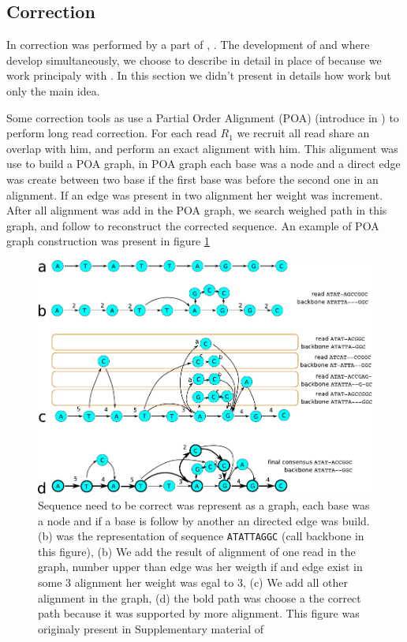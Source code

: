 \documentclass[main]{subfiles}
\begin{document}
\subsection{Correction}

In \canu correction was performed by a part of  \cite{falcon}, . The development of  and \canu where develop simultaneously, we choose to describe \canu in detail in place of  because we work principaly with \canu. In this section we didn't present in details how  work but only the main idea.

Some correction tools as  use a Partial Order Alignment (POA) (introduce in \cite{poa}) to perform long read correction. For each read \texttt{$R_1$} we recruit all read share an overlap with him, and perform an exact alignment with him. This alignment was use to build a POA graph, in POA graph each base was a node and a direct edge was create between two base if the first base was before the second one in an alignment. If an edge was present in two alignment her weight was increment. After all alignment was add in the POA graph, we search weighed path in this graph, and follow to reconstruct the corrected sequence. An example of POA graph construction was present in figure \ref{sota:fig:canu:correction}

\begin{figure}[ht]
    \centering
    \includegraphics[width=\textwidth]{state_of_the_art/images/POA_explain.pdf}
    \caption{Sequence need to be correct was represent as a graph, each base was a node and if a base is follow by another an directed edge was build. (b) was the representation of sequence \texttt{ATATTAGGC} (call backbone in this figure), (b) We add the result of alignment of one read in the graph, number upper than edge was her weigth if and edge exist in some 3 alignment her weight was egal to 3, (c) We add all other alignment in the graph, (d) the bold path was choose a the correct path because it was supported by more alignment. This figure was originaly present in Supplementary material of \hgap \cite{hgap}}
    \label{sota:fig:canu:correction}
\end{figure}
\end{document}
